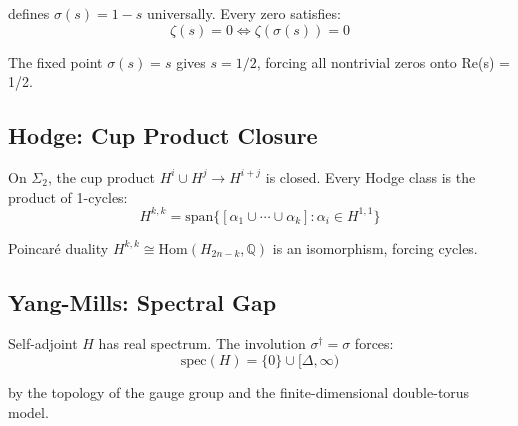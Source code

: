 \documentclass[12pt,a4paper]{article}
\theoremstyle{plain}
\theoremstyle{definition}
\theoremstyle{remark}
\begin{document}
defines $\sigma(s) = 1-s$ universally. Every zero satisfies:
\[
\zeta(s) = 0 \iff \zeta(\sigma(s)) = 0
\]

The fixed point $\sigma(s) = s$ gives $s = 1/2$, forcing all nontrivial zeros onto Re(s) = 1/2.

\subsection{Hodge: Cup Product Closure}

On $\Sigma_2$, the cup product $H^i \cup H^j \to H^{i+j}$ is closed. Every Hodge class is the product of 1-cycles:
\[
H^{k,k} = \text{span}\{[\alpha_1 \cup \cdots \cup \alpha_k] : \alpha_i \in H^{1,1}\}
\]

Poincaré duality $H^{k,k} \cong \text{Hom}(H_{2n-k}, \mathbb{Q})$ is an isomorphism, forcing cycles.

\subsection{Yang-Mills: Spectral Gap}

Self-adjoint $H$ has real spectrum. The involution $\sigma^\dagger = \sigma$ forces:
\[
\text{spec}(H) = \{0\} \cup [\Delta, \infty)
\]

by the topology of the gauge group and the finite-dimensional double-torus model.
\end{document}
